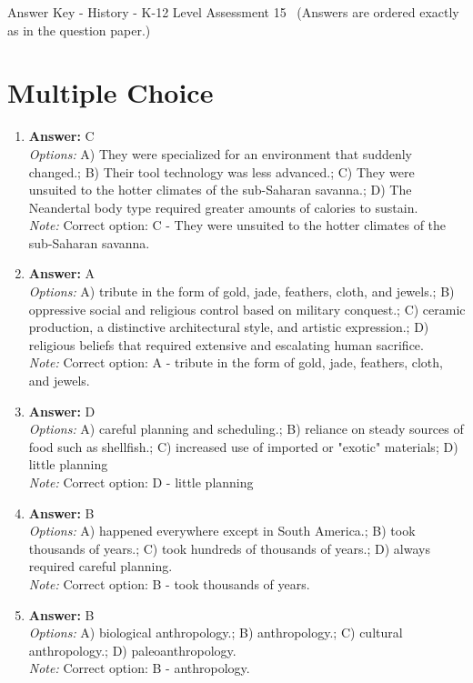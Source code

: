 \documentclass[12pt]{article}
\begin{document}
\begin{center}
Answer Key - History - K-12 Level Assessment 15 \
\small (Answers are ordered exactly as in the question paper.)
\end{center}

\section*{Multiple Choice}
\begin{enumerate}[label=\arabic*.]
\item \textbf{Answer:} C
\\ \textit{Options:} A) They were specialized for an environment that suddenly changed.; B) Their tool technology was less advanced.; C) They were unsuited to the hotter climates of the sub-Saharan savanna.; D) The Neandertal body type required greater amounts of calories to sustain.
\\ \textit{Note:} Correct option: C - They were unsuited to the hotter climates of the sub-Saharan savanna.
\item \textbf{Answer:} A
\\ \textit{Options:} A) tribute in the form of gold, jade, feathers, cloth, and jewels.; B) oppressive social and religious control based on military conquest.; C) ceramic production, a distinctive architectural style, and artistic expression.; D) religious beliefs that required extensive and escalating human sacrifice.
\\ \textit{Note:} Correct option: A - tribute in the form of gold, jade, feathers, cloth, and jewels.
\item \textbf{Answer:} D
\\ \textit{Options:} A) careful planning and scheduling.; B) reliance on steady sources of food such as shellfish.; C) increased use of imported or "exotic" materials; D) little planning
\\ \textit{Note:} Correct option: D - little planning
\item \textbf{Answer:} B
\\ \textit{Options:} A) happened everywhere except in South America.; B) took thousands of years.; C) took hundreds of thousands of years.; D) always required careful planning.
\\ \textit{Note:} Correct option: B - took thousands of years.
\item \textbf{Answer:} B
\\ \textit{Options:} A) biological anthropology.; B) anthropology.; C) cultural anthropology.; D) paleoanthropology.
\\ \textit{Note:} Correct option: B - anthropology.
\end{enumerate}
\end{document}
